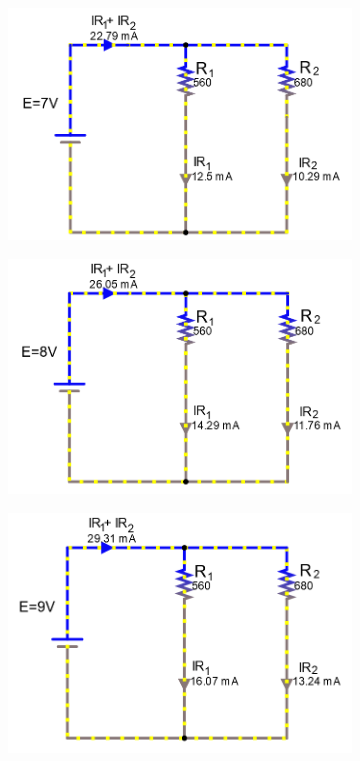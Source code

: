 \documentclass[a4paper]{article}
\begin{document}
\begin{figure}[H]
\begin{subfigure}{0.48\textwidth}
\includegraphics[width=1.16\linewidth]{amps_7}
\end{subfigure}
\begin{subfigure}{0.48\textwidth}
\includegraphics[width=1.16\linewidth]{amps_8}
\end{subfigure}
\begin{subfigure}{0.48\textwidth}
\includegraphics[width=1.16\linewidth]{amps_9}

\end{subfigure}
\end{figure}
\end{document}
